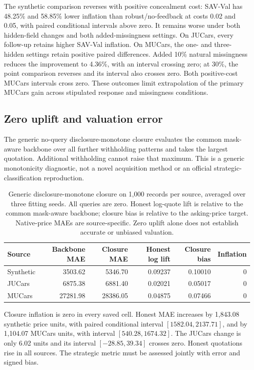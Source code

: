 The synthetic comparison reverses with positive concealment cost:
SAV-Val has 48.25\% and 58.85\% lower inflation than robust/no-feedback
at costs 0.02 and 0.05, with paired conditional intervals above zero.
It remains worse under both hidden-field changes and both added-missingness
settings. On JUCars, every follow-up retains higher SAV-Val inflation.
On MUCars, the one- and three-hidden settings retain positive paired
differences. Added 10\% natural missingness reduces the improvement to
4.36\%, with an interval crossing zero; at 30\%, the point comparison
reverses and its interval also crosses zero. Both positive-cost MUCars
intervals cross zero. These outcomes limit extrapolation of the primary
MUCars gain across stipulated response and missingness conditions.

\subsection{Zero uplift and valuation error}
The generic no-query disclosure-monotone closure evaluates the common
mask-aware backbone over all further withholding patterns and takes the
largest quotation. Additional withholding cannot raise that maximum.
This is a generic monotonicity diagnostic, not a novel acquisition
method or an official strategic-classification reproduction.

\begin{table}[t]
\centering
\caption{Generic disclosure-monotone closure on 1,000 records per source,
averaged over three fitting seeds. All queries are zero. Honest log-quote
lift is relative to the common mask-aware backbone; closure bias is
relative to the asking-price target. Native-price MAEs are source-specific.
Zero uplift alone does not establish accurate or unbiased valuation.}
\label{tab:closure_tradeoffs}
\begin{tabular}{lrrrrr}
\toprule
Source & Backbone MAE & Closure MAE & Honest log lift & Closure bias & Inflation\\
\midrule
Synthetic & 3503.62 & 5346.70 & 0.09237 & 0.10010 & 0\\
JUCars & 6875.38 & 6881.40 & 0.02021 & 0.05017 & 0\\
MUCars & 27281.98 & 28386.05 & 0.04875 & 0.07466 & 0\\
\bottomrule
\end{tabular}
\end{table}

Closure inflation is zero in every saved cell. Honest MAE increases by
1,843.08 synthetic price units, with paired conditional interval
$[1582.04,2137.71]$, and by 1,104.07 MUCars units, with interval
$[540.28,1674.32]$. The JUCars change is only 6.02 units and its interval
$[-28.85,39.34]$ crosses zero. Honest quotations rise in all sources.
The strategic metric must be assessed jointly with error and signed bias.

